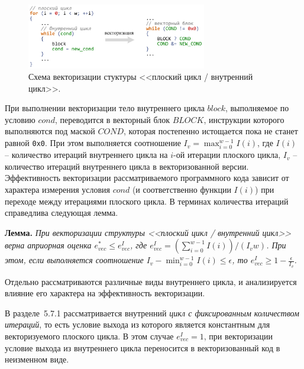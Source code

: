 \documentclass[a4paper,14pt]{extarticle}                     %
\theoremstyle{plain}                                         %
\begin{document}
\begin{figure}[!ht]
\centering
\includegraphics[width=0.7\textwidth]{./fig/vec_flat_loop_nest.pdf}
\singlespacing
\caption{Схема векторизации стуктуры <<плоский цикл / внутренний цикл>>.}
\label{fig:vec_flat_loop_nest}
\end{figure}

При выполнении векторизации тело внутреннего цикла $block$, выполняемое по условию $cond$, переводится в векторный блок $BLOCK$, инструкции которого выполняются под маской $COND$, которая постепенно истощается пока не станет равной \texttt{0x0}.
При этом выполняется соотношение $I_v = \max_{i = 0}^{w - 1}{I(i)}$, где $I(i)$ -- количество итераций внутреннего цикла на $i$-ой итерации плоского цикла, $I_v$ -- количество итераций внутреннего цикла в векторизованной версии.
Эффективность векторизации рассматриваемого программного кода зависит от характера измерения условия $cond$ (и соответственно функции $I(i)$) при переходе между итерациями плоского цикла.
В терминах количества итераций справедлива следующая лемма.

\textbf{Лемма.} \textit{При векторизации структуры <<плоский цикл / внутренний цикл>> верна априорная оценка $e_{vec}^{*} \le e_{vec}^I$, где $e_{vec}^I = ( \sum_{i = 0}^{w - 1}{I(i)} ) / (I_v w)$.
При этом, если выполняется соотношение $I_v - \min_{i = 0}^{w - 1}{I(i)} \le \epsilon$, то $e_{vec}^I \ge 1 - \frac{\epsilon}{I_v}$.}

Отдельно рассматриваются различные виды внутреннего цикла, и анализируется влияние его характера на эффективность векторизации.

В разделе~5.7.1 рассматривается внутренний \textit{цикл с фиксированным количеством итераций}, то есть условие выхода из которого является константным для векторизуемого плоского цикла.
В этом случае $e_{vec}^I = 1$, при векторизации условие выхода из внутреннего цикла переносится в векторизованный код в неизменном виде.
\end{document}

